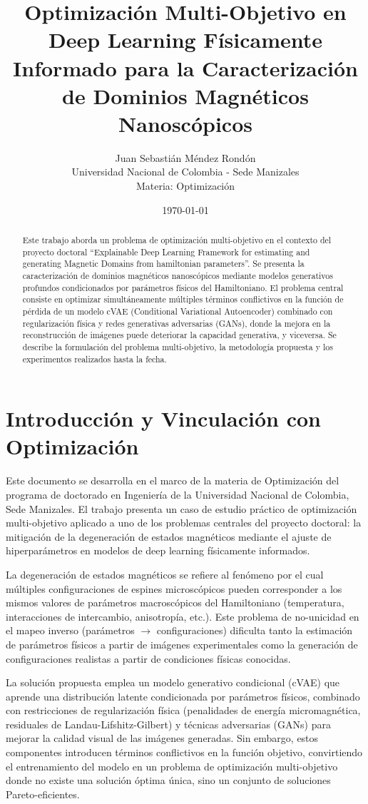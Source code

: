 \documentclass[12pt]{article}
\title{Optimización Multi-Objetivo en Deep Learning Físicamente Informado para la Caracterización de Dominios Magnéticos Nanoscópicos}
\author{Juan Sebastián Méndez Rondón\\
Universidad Nacional de Colombia - Sede Manizales\\
Materia: Optimización}
\date{\today}
\begin{document}
\maketitle

\begin{abstract}
Este trabajo aborda un problema de optimización multi-objetivo en el contexto del proyecto doctoral ``Explainable Deep Learning Framework for estimating and generating Magnetic Domains from hamiltonian parameters''. Se presenta la caracterización de dominios magnéticos nanoscópicos mediante modelos generativos profundos condicionados por parámetros físicos del Hamiltoniano. El problema central consiste en optimizar simultáneamente múltiples términos conflictivos en la función de pérdida de un modelo cVAE (Conditional Variational Autoencoder) combinado con regularización física y redes generativas adversarias (GANs), donde la mejora en la reconstrucción de imágenes puede deteriorar la capacidad generativa, y viceversa. Se describe la formulación del problema multi-objetivo, la metodología propuesta y los experimentos realizados hasta la fecha.
\end{abstract}

\section{Introducción y Vinculación con Optimización}

Este documento se desarrolla en el marco de la materia de Optimización del programa de doctorado en Ingeniería de la Universidad Nacional de Colombia, Sede Manizales. El trabajo presenta un caso de estudio práctico de optimización multi-objetivo aplicado a uno de los problemas centrales del proyecto doctoral: la mitigación de la degeneración de estados magnéticos mediante el ajuste de hiperparámetros en modelos de deep learning físicamente informados.

La degeneración de estados magnéticos se refiere al fenómeno por el cual múltiples configuraciones de espines microscópicos pueden corresponder a los mismos valores de parámetros macroscópicos del Hamiltoniano (temperatura, interacciones de intercambio, anisotropía, etc.). Este problema de no-unicidad en el mapeo inverso (parámetros $\to$ configuraciones) dificulta tanto la estimación de parámetros físicos a partir de imágenes experimentales como la generación de configuraciones realistas a partir de condiciones físicas conocidas.

La solución propuesta emplea un modelo generativo condicional (cVAE) que aprende una distribución latente condicionada por parámetros físicos, combinado con restricciones de regularización física (penalidades de energía micromagnética, residuales de Landau-Lifshitz-Gilbert) y técnicas adversarias (GANs) para mejorar la calidad visual de las imágenes generadas. Sin embargo, estos componentes introducen términos conflictivos en la función objetivo, convirtiendo el entrenamiento del modelo en un problema de optimización multi-objetivo donde no existe una solución óptima única, sino un conjunto de soluciones Pareto-eficientes.
\end{document}
